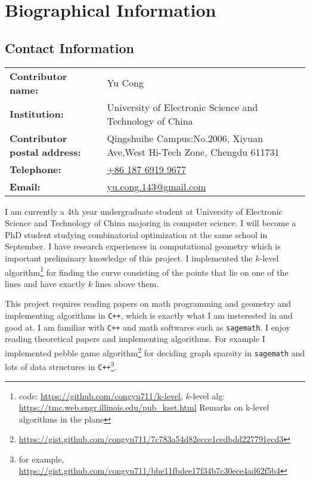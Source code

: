 \documentclass[11pt]{article}
\begin{document}
\section{Biographical Information}
\subsection*{Contact Information}

\begin{table}[H]
    \large
    \begin{tabular}{l p{12cm}}
    \textbf{Contributor name:} & Yu Cong\\ 
    \textbf{Institution:} & University of Electronic Science and Technology of China\\
    \textbf{Contributor postal address:} & Qingshuihe Campus:No.2006, Xiyuan Ave,\newline West Hi-Tech Zone, Chengdu 611731\\
    \textbf{Telephone:} & \href{tel:+8618769199677}{ +86 187 6919 9677}\\
    \textbf{Email:} & \href{mailto:yu.cong.143@gmail.com}{yu.cong.143@gmail.com}\\
    \end{tabular}%
\end{table}

I am currently a 4th year undergraduate student at University of Electronic Science and Technology of China majoring in computer science. I will become a PhD student studying combinatorial optimization at the same school in September. I have research experiences in computational geometry which is important preliminary knowledge of this project. I implemented the $k$-level algorithm\footnote{code: \url{https://github.com/congyu711/k-level}, $k$-level alg: \url{https://tmc.web.engr.illinois.edu/pub_kset.html} Remarks on k-level algorithms in the plane} for finding the curve consisting of the points that lie on one of the lines and have exactly $k$ lines above them.

This project requires reading papers on math programming and geometry and implementing algorithms in \texttt{C++}, which is exactly what I am insterested in and good at. I am familiar with \texttt{C++} and math softwares such as \texttt{sagemath}. I enjoy reading theoretical papers and implementing algorithms. For example I implemented pebble game algorithm\footnote{\url{https://gist.github.com/congyu711/7c783a54d82ecce1cedbdd227791ecd3}} for deciding graph sparsity in \texttt{sagemath} and lots of data structures in \texttt{C++}\footnote{for example, \url{https://gist.github.com/congyu711/bbe11fbdee17f34b7c30ece4ad62f5b4}}.
\end{document}
